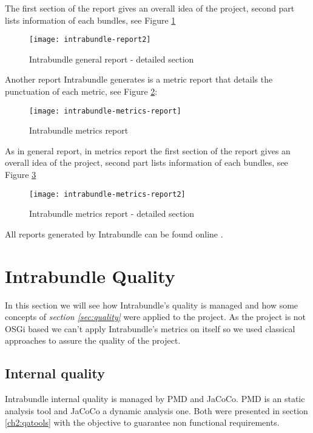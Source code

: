 The first section of the report gives an overall idea of the project, second part lists information of each bundles, see Figure \ref{intrabundle-report2} 

\begin{figure}[h]
\caption{Intrabundle general report - detailed section }
\label{intrabundle-report2}
\centering
\texttt{[image: intrabundle-report2]}
\end{figure}  
\FloatBarrier

Another report Intrabundle generates is a metric report that details the punctuation of each metric, see Figure \ref{intrabundle-metrics-report}:  

\begin{figure}[h]
\caption{Intrabundle metrics report}
\label{intrabundle-metrics-report}
\centering
\texttt{[image: intrabundle-metrics-report]}
\end{figure}  
\FloatBarrier

As in general report, in metrics report the first section of the report gives an overall idea of the project, second part lists information of each bundles, see Figure \ref{intrabundle-metrics-report2} 

\begin{figure}[h]
\caption{Intrabundle metrics report - detailed section}
\label{intrabundle-metrics-report2}
\centering
\texttt{[image: intrabundle-metrics-report2]}
\end{figure}  
\FloatBarrier

All reports generated by Intrabundle can be found online \citep{intrabundle reports 2014}.

\section{Intrabundle Quality}
In this section we will see how Intrabundle's quality is managed and how some concepts of \textit{section \ref{sec:quality}} were applied to the project. As the project is not OSGi based we can't apply Intrabundle's metrics on itself so we used classical approaches to assure the quality of the project.

\subsection{Internal quality}
Intrabundle internal quality is managed by PMD and JaCoCo. PMD is an static analysis tool and JaCoCo a dynamic analysis one. Both were presented in section \ref{ch2:qatools} with the objective to guarantee non functional requirements.

